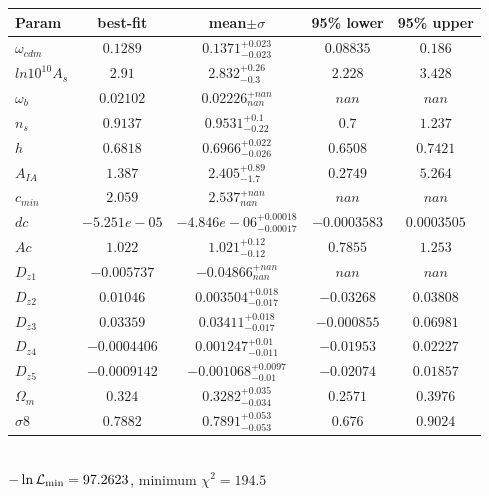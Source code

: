 \begin{tabular}{|l|c|c|c|c|} 
 \hline 
Param & best-fit & mean$\pm\sigma$ & 95\% lower & 95\% upper \\ \hline 
$\omega_{cdm }$ &$0.1289$ & $0.1371_{-0.023}^{+0.023}$ & $0.08835$ & $0.186$ \\ 
$ln10^{10}A_{s }$ &$2.91$ & $2.832_{-0.3}^{+0.26}$ & $2.228$ & $3.428$ \\ 
$\omega_{b }$ &$0.02102$ & $0.02226_{nan}^{+nan}$ & $nan$ & $nan$ \\ 
$n_{s }$ &$0.9137$ & $0.9531_{-0.22}^{+0.1}$ & $0.7$ & $1.237$ \\ 
$h$ &$0.6818$ & $0.6966_{-0.026}^{+0.022}$ & $0.6508$ & $0.7421$ \\ 
$A_{IA }$ &$1.387$ & $2.405_{-1.7}^{+0.89}$ & $0.2749$ & $5.264$ \\ 
$c_{min }$ &$2.059$ & $2.537_{nan}^{+nan}$ & $nan$ & $nan$ \\ 
$dc$ &$-5.251e-05$ & $-4.846e-06_{-0.00017}^{+0.00018}$ & $-0.0003583$ & $0.0003505$ \\ 
$Ac$ &$1.022$ & $1.021_{-0.12}^{+0.12}$ & $0.7855$ & $1.253$ \\ 
$D_{z1 }$ &$-0.005737$ & $-0.04866_{nan}^{+nan}$ & $nan$ & $nan$ \\ 
$D_{z2 }$ &$0.01046$ & $0.003504_{-0.017}^{+0.018}$ & $-0.03268$ & $0.03808$ \\ 
$D_{z3 }$ &$0.03359$ & $0.03411_{-0.017}^{+0.018}$ & $-0.000855$ & $0.06981$ \\ 
$D_{z4 }$ &$-0.0004406$ & $0.001247_{-0.011}^{+0.01}$ & $-0.01953$ & $0.02227$ \\ 
$D_{z5 }$ &$-0.0009142$ & $-0.001068_{-0.01}^{+0.0097}$ & $-0.02074$ & $0.01857$ \\ 
$\Omega_{m }$ &$0.324$ & $0.3282_{-0.034}^{+0.035}$ & $0.2571$ & $0.3976$ \\ 
$\sigma8$ &$0.7882$ & $0.7891_{-0.053}^{+0.053}$ & $0.676$ & $0.9024$ \\ 
\hline 
 \end{tabular} \\ 
$-\ln{\cal L}_\mathrm{min} =97.2623$, minimum $\chi^2=194.5$ \\ 
